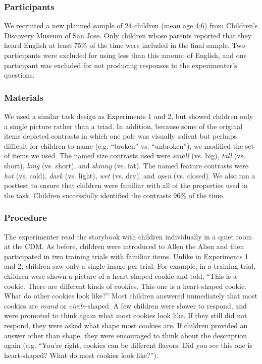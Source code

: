 \documentclass[man]{apa2}
\begin{document}
\subsubsection{Participants}

We recruited a new planned sample of 24 children (mean age 4;6) from Children's Discovery Museum of San Jose.  Only children whose parents reported that they heard English at least 75\% of the time were included in the final sample.  Two participants were excluded for using less than this amount of English, and one participant was excluded for not producing responses to the experimenter's questions.

\subsubsection{Materials}

We used a similar task design as Experiments 1 and 2, but showed children only a single picture rather than a triad.  In addition, because some of the original items depicted contrasts in which one pole was visually salient but perhaps difficult for children to name (e.g. ``broken'' vs. ``unbroken''), we modified the set of items we used.  The named size contrasts used were \emph{small} (vs. big), \emph{tall} (vs. short), \emph{long} (vs. short), and \emph{skinny} (vs. fat).  The named feature contrasts were \emph{hot} (vs. cold), \emph{dark} (vs. light), \emph{wet} (vs. dry), and \emph{open} (vs. closed).  We also ran a posttest to ensure that children were familiar with all of the properties used in the task.  Children successfully identified the contrasts 96\% of the time.

\subsubsection{Procedure}

The experimenter read the storybook with children individually in a quiet room at the CDM. As before, children were introduced to Allen the Alien and then participated in two training trials with familiar items. Unlike in  Experiments 1 and 2, children saw only a single image per trial. For example, in a training trial, children were shown a picture of a heart-shaped cookie and told, ``This is a cookie.  There are different kinds of cookies.  This one is a heart-shaped cookie.  What do other cookies look like?'' Most children answered immediately that most cookies are \emph{round} or \emph{circle}-shaped. A few children were slower to respond, and were promoted to think again what most cookies look like. If they still did not respond, they were asked what shape most cookies are.  If children provided an answer other than shape, they were encouraged to think about the description again (e.g. ``You're right, cookies can be different flavors. Did you see this one is heart-shaped?  What do most cookies look like?''). 
\end{document}
